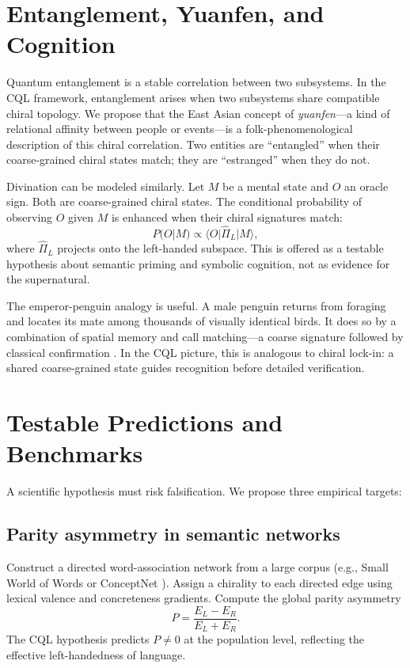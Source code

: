 \documentclass[11pt,a4paper]{article}
\begin{document}
\section{Entanglement, Yuanfen, and Cognition}

Quantum entanglement is a stable correlation between two subsystems. In the CQL framework, entanglement arises when two subsystems share compatible chiral topology. We propose that the East Asian concept of \emph{yuanfen}---a kind of relational affinity between people or events---is a folk-phenomenological description of this chiral correlation. Two entities are ``entangled'' when their coarse-grained chiral states match; they are ``estranged'' when they do not.

Divination can be modeled similarly. Let $M$ be a mental state and $O$ an oracle sign. Both are coarse-grained chiral states. The conditional probability of observing $O$ given $M$ is enhanced when their chiral signatures match:
\begin{equation}
P(O|M) \propto \langle O | \hat \Pi_L | M \rangle,
\end{equation}
where $\hat \Pi_L$ projects onto the left-handed subspace. This is offered as a testable hypothesis about semantic priming and symbolic cognition, not as evidence for the supernatural.

The emperor-penguin analogy is useful. A male penguin returns from foraging and locates its mate among thousands of visually identical birds. It does so by a combination of spatial memory and call matching---a coarse signature followed by classical confirmation \cite{aubin98}. In the CQL picture, this is analogous to chiral lock-in: a shared coarse-grained state guides recognition before detailed verification.

\section{Testable Predictions and Benchmarks}

A scientific hypothesis must risk falsification. We propose three empirical targets:

\subsection{Parity asymmetry in semantic networks}

Construct a directed word-association network from a large corpus (e.g., Small World of Words \cite{deyoe19} or ConceptNet \cite{speer17}). Assign a chirality to each directed edge using lexical valence and concreteness gradients. Compute the global parity asymmetry
\begin{equation}
P = \frac{E_L - E_R}{E_L + E_R}.
\end{equation}
The CQL hypothesis predicts $P \neq 0$ at the population level, reflecting the effective left-handedness of language.
\end{document}
